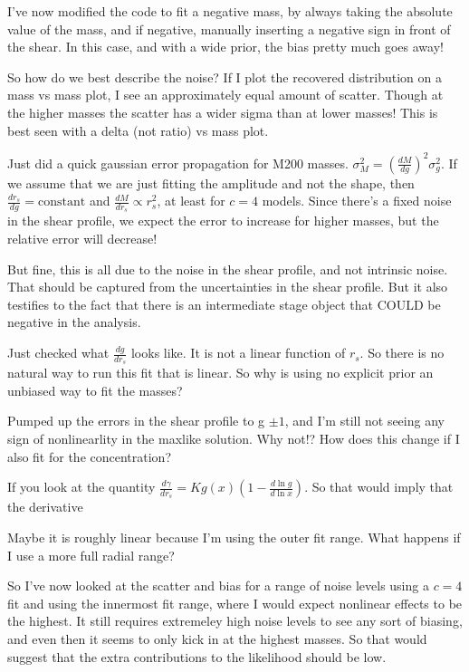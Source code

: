 \documentclass[11pt]{article}
\begin{document}
I've now modified the code to fit a negative mass, by always taking the absolute value of the mass, and if negative, manually inserting a negative sign in front of the shear. In this case, and with a wide prior, the bias pretty much goes away!

So how do we best describe the noise?
If I plot the recovered distribution on a mass vs mass plot, I see an approximately equal amount of scatter. Though at the higher masses the scatter has a wider sigma than at lower masses!
This is best seen with a delta (not ratio) vs mass plot.


Just did a quick gaussian error propagation for M200 masses. $\sigma_M^2 = (\frac{dM}{dg})^2\sigma_g^2$. If we assume that we are just fitting the amplitude and not the shape, then $\frac{dr_s}{dg} = \mathrm{constant}$ and $\frac{dM}{dr_s} \propto r_s^2$, at least for $c=4$ models. Since there's a fixed noise in the shear profile, we expect the error to increase for higher masses, but the relative error will decrease!

But fine, this is all due to the noise in the shear profile, and not intrinsic noise. That should be captured from the uncertainties in the shear profile. But it also testifies to the fact that there is an intermediate stage object that COULD be negative in the analysis. 


Just checked what $\frac{dg}{dr_s}$ looks like. It is not a linear function of $r_s$. So there is no natural way to run this fit that is linear. So why is using no explicit prior an unbiased way to fit the masses?

Pumped up the errors in the shear profile to g $\pm1$, and I'm still not seeing any sign of nonlinearlity in the maxlike solution. Why not!? 
How does this change if I also fit for the concentration?

If you look at the quantity $\frac{d\gamma}{dr_s} = Kg(x)(1 - \frac{d\ln g}{d\ln x})$. So that would imply that the derivative 

Maybe it is roughly linear because I'm using the outer fit range. What happens if I use a more full radial range?


So I've now looked at the scatter and bias for a range of noise levels using a $c=4$ fit and using the innermost fit range, where I would expect nonlinear effects to be the highest. It still requires extremeley high noise levels to see any sort of biasing, and even then it seems to only kick in at the highest masses. So that would suggest that the extra contributions to the likelihood should be low.
\end{document}
